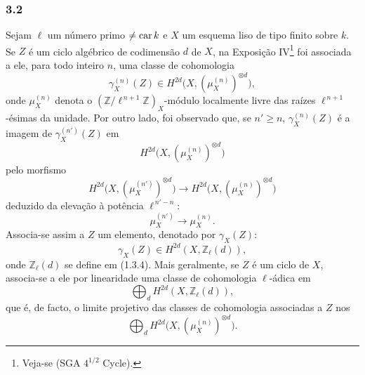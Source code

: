 \subsubsection*{3.2}
Sejam \(\ell\) um número primo \(\ne\operatorname{car} k\) e \(X\) um esquema liso de tipo finito sobre \(k\). Se \(Z\) é um ciclo algébrico de codimensão \(d\) de \(X\), na Exposição IV\footnote{Veja-se (SGA \(4^{1/2}\) Cycle).} foi associada a ele, para todo inteiro \(n\), uma classe de cohomologia
\[
\gamma_X^{(n)}(Z)\in H^{2d}\bigl(X,(\mu_X^{(n)})^{\otimes d}\bigr),
\]
onde \(\mu_X^{(n)}\) denota o \((\mathbb Z/\ell^{\,n+1}\mathbb Z)_X\)-módulo localmente livre das raízes \(\ell^{\,n+1}\)-ésimas da unidade. Por outro lado, foi observado que, se \(n'\ge n\), \(\gamma_X^{(n)}(Z)\) é a imagem de \(\gamma_X^{(n')}(Z)\) em
\[
H^{2d}\bigl(X,(\mu_X^{(n)})^{\otimes d}\bigr)
\]
pelo morfismo
\[
H^{2d}\bigl(X,(\mu_X^{(n')})^{\otimes d}\bigr)
\longrightarrow
H^{2d}\bigl(X,(\mu_X^{(n)})^{\otimes d}\bigr)
\]
deduzido da elevação à potência \(\ell^{\,n'-n}\):
\[
\mu_X^{(n')}\longrightarrow \mu_X^{(n)}.
\]
Associa-se assim a \(Z\) um elemento, denotado por \(\gamma_X(Z)\):
\[
\gamma_X(Z)\in H^{2d}(X,\mathbb Z_\ell(d)),
\]
onde \(\mathbb Z_\ell(d)\) se define em (1.3.4). Mais geralmente, se \(Z\) é um ciclo de \(X\), associa-se a ele por linearidade uma classe de cohomologia \(\ell\)-ádica em
\[
\bigoplus_d H^{2d}(X,\mathbb Z_\ell(d)),
\]
que é, de facto, o limite projetivo das classes de cohomologia associadas a \(Z\) nos
\[
\bigoplus_d H^{2d}\bigl(X,(\mu_X^{(n)})^{\otimes d}\bigr).
\]
